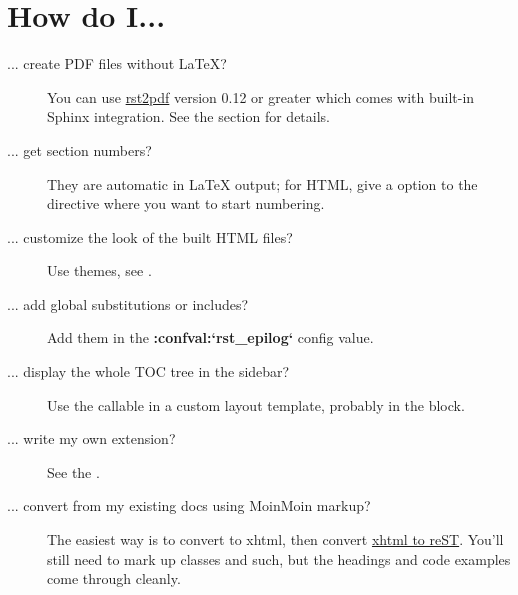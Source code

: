 \documentclass[letterpaper,10pt,english]{sphinxmanual}
\begin{document}
\section{How do I...}
\label{faq:how-do-i}\begin{description}
\item[{... create PDF files without LaTeX?}] \leavevmode
You can use \href{http://rst2pdf.googlecode.com}{rst2pdf} version 0.12 or greater
which comes with built-in Sphinx integration.  See the {\hyperref[builders:builders]{}}
section for details.

\item[{... get section numbers?}] \leavevmode
They are automatic in LaTeX output; for HTML, give a  option to
the {\hyperref[markup/toctree:directive\string-toctree]{}} directive where you want to start numbering.

\item[{... customize the look of the built HTML files?}] \leavevmode
Use themes, see {\hyperref[theming::doc]{}}.

\item[{... add global substitutions or includes?}] \leavevmode
Add them in the {\color{red}\bfseries{}:confval:{}`rst\_epilog{}`} config value.

\item[{... display the whole TOC tree in the sidebar?}] \leavevmode
Use the {\hyperref[templating:toctree]{}} callable in a custom layout template, probably in the
 block.

\item[{... write my own extension?}] \leavevmode
See the {\hyperref[ext/tutorial:exttut]{}}.

\item[{... convert from my existing docs using MoinMoin markup?}] \leavevmode
The easiest way is to convert to xhtml, then convert \href{http://docutils.sourceforge.net/sandbox/xhtml2rest/xhtml2rest.py}{xhtml to reST}.  You'll
still need to mark up classes and such, but the headings and code examples
come through cleanly.

\end{description}
\end{document}

